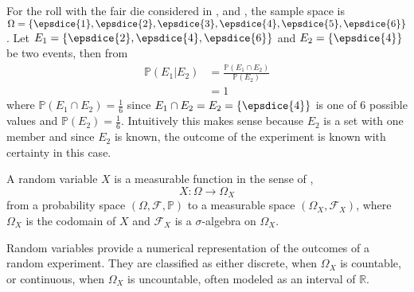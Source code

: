 \begin{example}
	For the roll with the fair die considered in ,  and , the sample space is $\Omega = \{ \epsdice{1}, \epsdice{2}, \epsdice{3}, \epsdice{4}, \epsdice{5}, \epsdice{6} \}$. Let $E_1 = \{\epsdice{2}, \epsdice{4}, \epsdice{6}\}$ and $E_2 = \{\epsdice{4}\}$ be two events, then from 
	\begin{equation}
		\begin{split}
			\mathbb{P}(E_1|E_2) &= \frac{\mathbb{P}(E_1 \cap E_2)}{\mathbb{P}(E_2)}\\
			& = 1
		\end{split}
	\end{equation}
	where $\mathbb{P}(E_1 \cap E_2)= \frac{1}{6}$ since $E_1\cap E_2 = E_2=\{\epsdice{4}\}$ is one of $6$ possible values and $\mathbb{P}(E_2) = \frac{1}{6}$. Intuitively this makes sense because $E_2$ is a set with one member and since $E_2$ is known, the outcome of the experiment is known with certainty in this case.
\end{example}

\begin{definition}
	\label{def:random_Variable}
	A random variable $X$ is a measurable function in the sense of ,
	\begin{equation}
		X\colon \Omega \to \Omega_X
	\end{equation}
	from a probability space $(\Omega, \mathcal{F}, \mathbb{P})$ to a measurable space $(\Omega_X, \mathcal{F}_X)$, where $\Omega_X$ is the codomain of $X$ and $\mathcal{F}_X$ is a $\sigma$-algebra on $\Omega_X$.
\end{definition}

\begin{remark}
	Random variables provide a numerical representation of the outcomes of a random experiment.  
	They are classified as either discrete, when $\Omega_X$ is countable, or continuous, when $\Omega_X$ is uncountable, often modeled as an interval of $\mathbb{R}$.
\end{remark}

